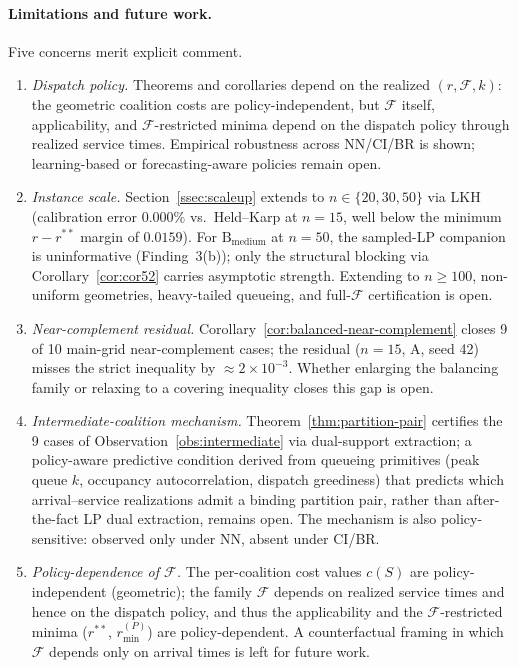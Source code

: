 \documentclass[11pt]{article}
\theoremstyle{plain}
\theoremstyle{definition}
\theoremstyle{remark}
\newcommand{\F}{\mathcal{F}}
\begin{document}
\paragraph{Limitations and future work.} Five concerns merit explicit comment.
\begin{enumerate}[label=(\roman*),leftmargin=*,itemsep=2pt,topsep=2pt]
\item \emph{Dispatch policy.} Theorems and corollaries depend on the
  realized $(r,\F,k)$: the geometric coalition costs are
  policy-independent, but $\F$ itself, applicability, and
  $\F$-restricted minima depend on the dispatch policy through
  realized service times. Empirical robustness across NN/CI/BR is
  shown; learning-based or forecasting-aware policies remain open.
\item \emph{Instance scale.} Section~\ref{ssec:scaleup} extends to
  $n\in\{20,30,50\}$ via LKH (calibration error $0.000\%$ vs.\
  Held--Karp at $n=15$, well below the minimum $r-r^{\ast\ast}$ margin
  of $0.0159$). For $\text{B}_{\text{medium}}$ at $n=50$, the
  sampled-LP companion is uninformative (Finding~3(b)); only the
  structural blocking via Corollary~\ref{cor:cor52} carries asymptotic
  strength. Extending to $n\ge 100$, non-uniform geometries,
  heavy-tailed queueing, and full-$\F$ certification is open.
\item \emph{Near-complement residual.}
  Corollary~\ref{cor:balanced-near-complement} closes 9 of 10
  main-grid near-complement cases; the residual ($n=15$, A, seed 42)
  misses the strict inequality by $\approx 2\times 10^{-3}$. Whether
  enlarging the balancing family or relaxing to a covering inequality
  closes this gap is open.
\item \emph{Intermediate-coalition mechanism.}
  Theorem~\ref{thm:partition-pair} certifies the 9 cases of
  Observation~\ref{obs:intermediate} via dual-support extraction; a
  policy-aware predictive condition derived from queueing primitives
  (peak queue $k$, occupancy autocorrelation, dispatch greediness)
  that predicts which arrival--service realizations admit a binding
  partition pair, rather than after-the-fact LP dual extraction,
  remains open. The mechanism is also policy-sensitive: observed only
  under NN, absent under CI/BR.
\item \emph{Policy-dependence of $\F$.} The per-coalition cost values
  $c(S)$ are policy-independent (geometric); the family $\F$ depends
  on realized service times and hence on the dispatch policy, and
  thus the applicability and the $\F$-restricted minima
  ($r^{\ast\ast}$, $r^{(P)}_{\min}$) are policy-dependent. A
  counterfactual framing in which $\F$ depends only on arrival times
  is left for future work.
\end{enumerate}
\end{document}
